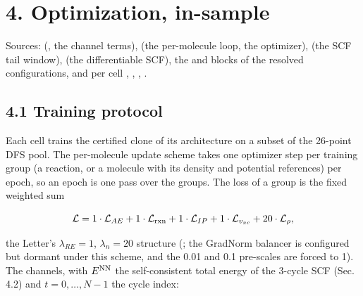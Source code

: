 \documentclass[10pt,a4paper]{article}
\begin{document}
\section*{4. Optimization, in-sample}

Sources:  (, the channel terms),  (the per-molecule loop, the optimizer),  (the SCF tail window),  (the differentiable SCF), the  and  blocks of the resolved configurations, and per cell , , , .

\subsection*{4.1 Training protocol}

Each cell trains the certified clone of its architecture on a subset of the 26-point DFS pool. The per-molecule update scheme takes one optimizer step per training group (a reaction, or a molecule with its density and potential references) per epoch, so an epoch is one pass over the groups. The loss of a group is the fixed weighted sum

\[
\mathcal{L} = 1\cdot\mathcal{L}_{AE} + 1\cdot\mathcal{L}_{\rm rxn} + 1\cdot\mathcal{L}_{IP} + 1\cdot\mathcal{L}_{v_{xc}} + 20\cdot\mathcal{L}_{\rho},
\]

the Letter's $\lambda_{RE} = 1$, $\lambda_n = 20$ structure (; the GradNorm balancer is configured but dormant under this scheme, and the  0.01 and  0.1 pre-scales are forced to 1). The channels, with $E^{\rm NN}$ the self-consistent total energy of the 3-cycle SCF (Sec. 4.2) and $t = 0, \ldots, N-1$ the cycle index:
\end{document}
